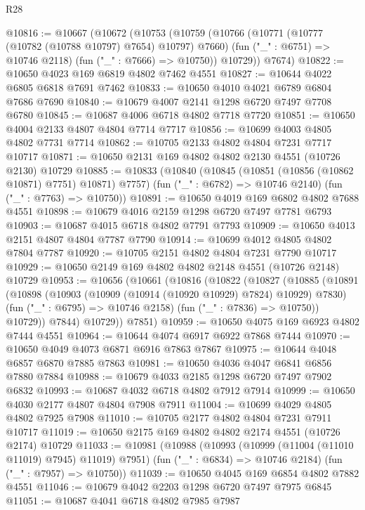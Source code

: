 \begin{lexlean}{R28}
\begin{coremodule}
@10816 := @10667
    (@10672
      (@10753
        (@10759
          (@10766
            (@10771 (@10777 (@10782 (@10788 @10797) @7654) @10797) @7660)
            (fun ("_" : @6751) => @10746 @2118)
            (fun ("_" : @7666) => @10750))
          @10729))
      @7674)
@10822 := @10650 @4023 @169 @6819 @4802 @7462 @4551
@10827 := @10644 @4022 @6805 @6818 @7691 @7462
@10833 := @10650 @4010 @4021 @6789 @6804 @7686 @7690
@10840 := @10679 @4007 @2141 @1298 @6720 @7497 @7708 @6780
@10845 := @10687 @4006 @6718 @4802 @7718 @7720
@10851 := @10650 @4004 @2133 @4807 @4804 @7714 @7717
@10856 := @10699 @4003 @4805 @4802 @7731 @7714
@10862 := @10705 @2133 @4802 @4804 @7231 @7717 @10717
@10871 := @10650 @2131 @169 @4802 @4802 @2130 @4551 (@10726 @2130) @10729
@10885 := @10833
    (@10840
      (@10845 (@10851 (@10856 (@10862 @10871) @7751) @10871) @7757)
      (fun ("_" : @6782) => @10746 @2140)
      (fun ("_" : @7763) => @10750))
@10891 := @10650 @4019 @169 @6802 @4802 @7688 @4551
@10898 := @10679 @4016 @2159 @1298 @6720 @7497 @7781 @6793
@10903 := @10687 @4015 @6718 @4802 @7791 @7793
@10909 := @10650 @4013 @2151 @4807 @4804 @7787 @7790
@10914 := @10699 @4012 @4805 @4802 @7804 @7787
@10920 := @10705 @2151 @4802 @4804 @7231 @7790 @10717
@10929 := @10650 @2149 @169 @4802 @4802 @2148 @4551 (@10726 @2148) @10729
@10953 := @10656
    (@10661
      (@10816
        (@10822
          (@10827
            (@10885
              (@10891
                (@10898
                  (@10903 (@10909 (@10914 (@10920 @10929) @7824) @10929) @7830)
                  (fun ("_" : @6795) => @10746 @2158)
                  (fun ("_" : @7836) => @10750))
                @10729))
            @7844)
          @10729))
      @7851)
@10959 := @10650 @4075 @169 @6923 @4802 @7444 @4551
@10964 := @10644 @4074 @6917 @6922 @7868 @7444
@10970 := @10650 @4049 @4073 @6871 @6916 @7863 @7867
@10975 := @10644 @4048 @6857 @6870 @7885 @7863
@10981 := @10650 @4036 @4047 @6841 @6856 @7880 @7884
@10988 := @10679 @4033 @2185 @1298 @6720 @7497 @7902 @6832
@10993 := @10687 @4032 @6718 @4802 @7912 @7914
@10999 := @10650 @4030 @2177 @4807 @4804 @7908 @7911
@11004 := @10699 @4029 @4805 @4802 @7925 @7908
@11010 := @10705 @2177 @4802 @4804 @7231 @7911 @10717
@11019 := @10650 @2175 @169 @4802 @4802 @2174 @4551 (@10726 @2174) @10729
@11033 := @10981
    (@10988
      (@10993 (@10999 (@11004 (@11010 @11019) @7945) @11019) @7951)
      (fun ("_" : @6834) => @10746 @2184)
      (fun ("_" : @7957) => @10750))
@11039 := @10650 @4045 @169 @6854 @4802 @7882 @4551
@11046 := @10679 @4042 @2203 @1298 @6720 @7497 @7975 @6845
@11051 := @10687 @4041 @6718 @4802 @7985 @7987

\end{coremodule}
\end{lexlean}
